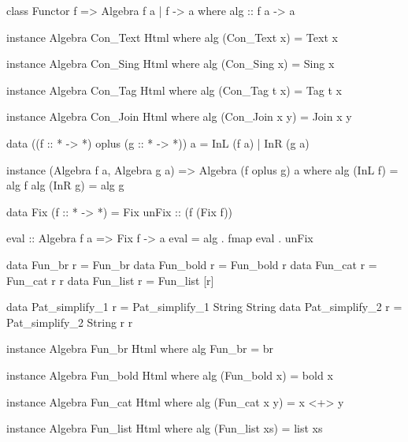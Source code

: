 \begin{code}
class Functor f => Algebra f a | f -> a where
  alg :: f a -> a
\end{code}

\begin{code}
instance Algebra Con_Text Html where
  alg (Con_Text x) = Text x

instance Algebra Con_Sing Html where
  alg (Con_Sing x) = Sing x

instance Algebra Con_Tag Html where
  alg (Con_Tag t x) = Tag t x

instance Algebra Con_Join Html where
  alg (Con_Join x y) = Join x y
\end{code}



\begin{code}
data ((f :: * -> *) oplus (g :: * -> *)) a = InL (f a) | InR (g a)
\end{code}


\begin{code}
instance (Algebra f a, Algebra g a) => Algebra (f oplus g) a
  where  alg (InL f) = alg f
         alg (InR g) = alg g
\end{code}


\begin{code}
  data Fix (f :: * -> *) = Fix { unFix :: (f (Fix f)) }
\end{code}

\begin{code}
eval :: Algebra f a => Fix f -> a
eval = alg . fmap eval . unFix
\end{code}


\begin{code}
data Fun_br     r = Fun_br
data Fun_bold   r = Fun_bold r
data Fun_cat    r = Fun_cat r r
data Fun_list   r = Fun_list [r]
\end{code}

\begin{code}
data Pat_simplify_1 r = Pat_simplify_1 String String
data Pat_simplify_2 r = Pat_simplify_2 String r r
\end{code}

\begin{code}
instance Algebra Fun_br Html where
  alg Fun_br = br

instance Algebra Fun_bold Html where
  alg (Fun_bold x) = bold x

instance Algebra Fun_cat Html where
  alg (Fun_cat x y) = x <+> y

instance Algebra Fun_list Html where
  alg (Fun_list xs) = list xs
\end{code}


